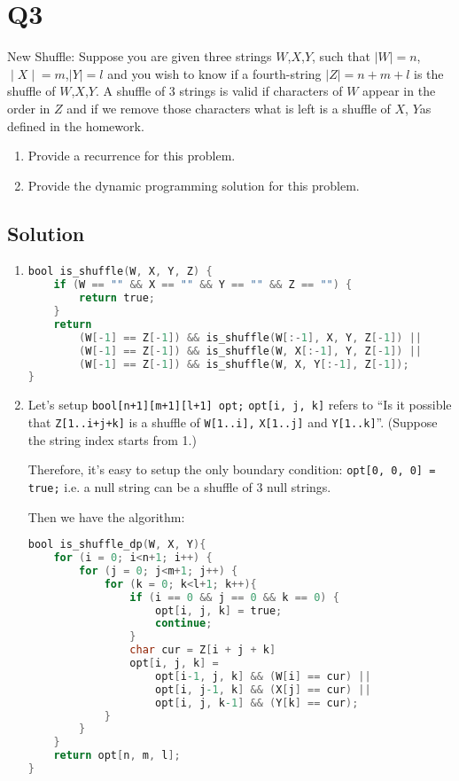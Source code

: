 
\section*{Q3}

New Shuffle: Suppose you are given three strings $W$,$X$,$Y$, such that $|W|=n$,$∣X∣=m$,$|Y|=l$ and you wish to know if a fourth-string $|Z|=n+m+l$ is the shuffle of $W$,$X$,$Y$.
A shuffle of 3 strings is valid if characters of $W$ appear in the order in $Z$ and if we remove those characters what is left is a shuffle of $X$, $Y$as defined in the homework.

\begin{enumerate}
    \item Provide a recurrence for this problem.
    \item Provide the dynamic programming solution for this problem.
\end{enumerate}

\subsection*{Solution}

\begin{enumerate}
    \item \begin{lstlisting}[language=C]
bool is_shuffle(W, X, Y, Z) {
    if (W == "" && X == "" && Y == "" && Z == "") {
        return true;
    }
    return 
        (W[-1] == Z[-1]) && is_shuffle(W[:-1], X, Y, Z[-1]) || 
        (W[-1] == Z[-1]) && is_shuffle(W, X[:-1], Y, Z[-1]) ||
        (W[-1] == Z[-1]) && is_shuffle(W, X, Y[:-1], Z[-1]);
}
    \end{lstlisting}

    \item Let's setup \lstinline{bool[n+1][m+1][l+1] opt;}
          \lstinline{opt[i, j, k]} refers to ``Is it possible that \lstinline{Z[1..i+j+k]} is a shuffle of \lstinline{W[1..i],} \lstinline{X[1..j]} and \lstinline{Y[1..k]}''.
          (Suppose the string index starts from 1.)

          Therefore, it's easy to setup the only boundary condition: \lstinline{opt[0, 0, 0] = true;} i.e. a null string can be a shuffle of 3 null strings.

          Then we have the algorithm:

          \begin{lstlisting}[language=C]
bool is_shuffle_dp(W, X, Y){
    for (i = 0; i<n+1; i++) {
        for (j = 0; j<m+1; j++) {
            for (k = 0; k<l+1; k++){
                if (i == 0 && j == 0 && k == 0) {
                    opt[i, j, k] = true;
                    continue;
                }
                char cur = Z[i + j + k]
                opt[i, j, k] = 
                    opt[i-1, j, k] && (W[i] == cur) || 
                    opt[i, j-1, k] && (X[j] == cur) ||
                    opt[i, j, k-1] && (Y[k] == cur);
            }
        }
    }
    return opt[n, m, l];
}
          \end{lstlisting}
\end{enumerate}